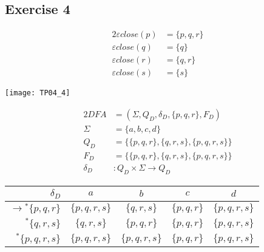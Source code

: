 {\subsection{Exercise 4}
\begin{alignat*}{2}
	\varepsilon close(p)&=\{p,q,r\}\\
	\varepsilon close(q)&=\{q\}\\
	\varepsilon close(r)&=\{q,r\}\\
	\varepsilon close(s)&=\{s\}
\end{alignat*}
\begin{center} \texttt{[image: TP04\_4]} \end{center}
\begin{alignat*}{2}
	DFA       &= (\Sigma, Q_D, \delta_D, \{p,q,r\}, F_D)\\
	\Sigma    &= \{a,b,c,d\}\\
	Q_D       &= \{\{p,q,r\},\{q,r,s\},\{p,q,r,s\}\}\\
	F_D       &= \{\{p,q,r\},\{q,r,s\},\{p,q,r,s\}\}\\
	\delta_D &\colon Q_D \times \Sigma \rightarrow Q_D
\end{alignat*}
\begin{center}
\begin{tabular}{ r | c c c c }
    $\delta_D                    $ & $a          $ & $b          $ & $c          $ & $d          $ \\ \hline
    $\rightarrow{^\ast} \{p,q,r  \}$ & $\{p,q,r,s\}$ & $\{  q,r,s\}$ & $\{p,q,r  \}$ & $\{p,q,r,s\}$ \\
    $           {^\ast} \{  q,r,s\}$ & $\{  q,r,s\}$ & $\{p,q,r  \}$ & $\{p,q,r  \}$ & $\{p,q,r,s\}$ \\
    $           {^\ast} \{p,q,r,s\}$ & $\{p,q,r,s\}$ & $\{p,q,r,s\}$ & $\{p,q,r  \}$ & $\{p,q,r,s\}$ \\
\end{tabular}
\end{center}
}
